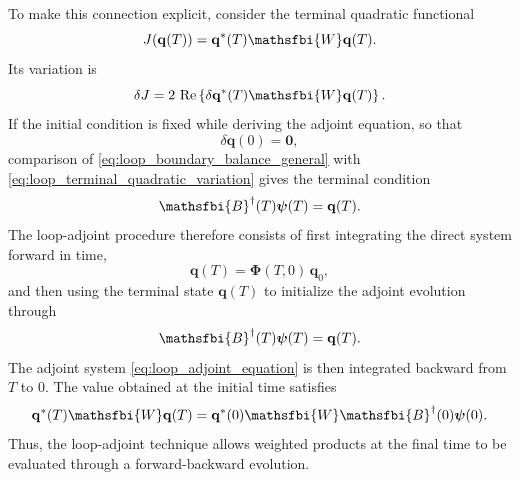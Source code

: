 \begin{appendices}
To make this connection explicit, consider the terminal quadratic functional
\begin{equation}
  J(\mathbf{q}(T))
  =
  \mathbf{q}^{*}(T)\mathsfbi{W}\mathbf{q}(T).
  \label{eq:loop_terminal_quadratic_functional}
\end{equation}
Its variation is
\begin{equation}
  \delta J
  =
  2\,\operatorname{Re}
  \left\{
    \delta\mathbf{q}^{*}(T)
    \mathsfbi{W}
    \mathbf{q}(T)
  \right\}.
  \label{eq:loop_terminal_quadratic_variation}
\end{equation}
If the initial condition is fixed while deriving the adjoint equation, so that
\begin{equation}
  \delta\mathbf{q}(0)=\mathbf{0},
  \label{eq:loop_fixed_initial_variation}
\end{equation}
comparison of \eqref{eq:loop_boundary_balance_general} with \eqref{eq:loop_terminal_quadratic_variation} gives the terminal condition
\begin{equation}
  \mathsfbi{B}^{\dagger}(T)\boldsymbol{\psi}(T)
  =
  \mathbf{q}(T).
  \label{eq:loop_adjoint_terminal_condition}
\end{equation}
The loop-adjoint procedure therefore consists of first integrating the direct system forward in time,
\begin{equation}
  \mathbf{q}(T)
  =
  \boldsymbol{\Phi}(T,0)\,\mathbf{q}_0,
  \label{eq:loop_forward_solution}
\end{equation}
and then using the terminal state \(\mathbf{q}(T)\) to initialize the adjoint evolution through
\begin{equation}
  \mathsfbi{B}^{\dagger}(T)\boldsymbol{\psi}(T)
  =
  \mathbf{q}(T).
  \label{eq:loop_terminal_projection}
\end{equation}
The adjoint system \eqref{eq:loop_adjoint_equation} is then integrated backward from \(T\) to \(0\). The value obtained at the initial time satisfies
\begin{equation}
  \mathbf{q}^{*}(T)\mathsfbi{W}\mathbf{q}(T)
  =
  \mathbf{q}^{*}(0)
  \mathsfbi{W}
  \mathsfbi{B}^{\dagger}(0)\boldsymbol{\psi}(0).
  \label{eq:loop_inner_product_identity}
\end{equation}
Thus, the loop-adjoint technique allows weighted products at the final time to be evaluated through a forward-backward evolution.


\end{appendices}
